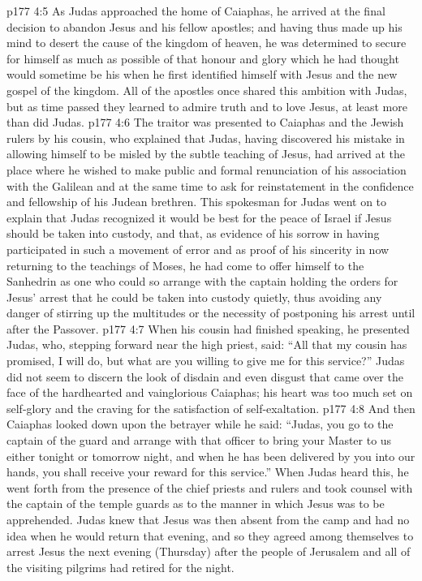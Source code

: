 \vs p177 4:5 As Judas approached the home of Caiaphas, he arrived at the final decision to abandon Jesus and his fellow apostles; and having thus made up his mind to desert the cause of the kingdom of heaven, he was determined to secure for himself as much as possible of that honour and glory which he had thought would sometime be his when he first identified himself with Jesus and the new gospel of the kingdom. All of the apostles once shared this ambition with Judas, but as time passed they learned to admire truth and to love Jesus, at least more than did Judas.
\vs p177 4:6 The traitor was presented to Caiaphas and the Jewish rulers by his cousin, who explained that Judas, having discovered his mistake in allowing himself to be misled by the subtle teaching of Jesus, had arrived at the place where he wished to make public and formal renunciation of his association with the Galilean and at the same time to ask for reinstatement in the confidence and fellowship of his Judean brethren. This spokesman for Judas went on to explain that Judas recognized it would be best for the peace of Israel if Jesus should be taken into custody, and that, as evidence of his sorrow in having participated in such a movement of error and as proof of his sincerity in now returning to the teachings of Moses, he had come to offer himself to the Sanhedrin as one who could so arrange with the captain holding the orders for Jesus’ arrest that he could be taken into custody quietly, thus avoiding any danger of stirring up the multitudes or the necessity of postponing his arrest until after the Passover.
\vs p177 4:7 When his cousin had finished speaking, he presented Judas, who, stepping forward near the high priest, said: “All that my cousin has promised, I will do, but what are you willing to give me for this service?” Judas did not seem to discern the look of disdain and even disgust that came over the face of the hardhearted and vainglorious Caiaphas; his heart was too much set on self\hyp{}glory and the craving for the satisfaction of self\hyp{}exaltation.
\vs p177 4:8 And then Caiaphas looked down upon the betrayer while he said: “Judas, you go to the captain of the guard and arrange with that officer to bring your Master to us either tonight or tomorrow night, and when he has been delivered by you into our hands, you shall receive your reward for this service.” When Judas heard this, he went forth from the presence of the chief priests and rulers and took counsel with the captain of the temple guards as to the manner in which Jesus was to be apprehended. Judas knew that Jesus was then absent from the camp and had no idea when he would return that evening, and so they agreed among themselves to arrest Jesus the next evening (Thursday) after the people of Jerusalem and all of the visiting pilgrims had retired for the night.
